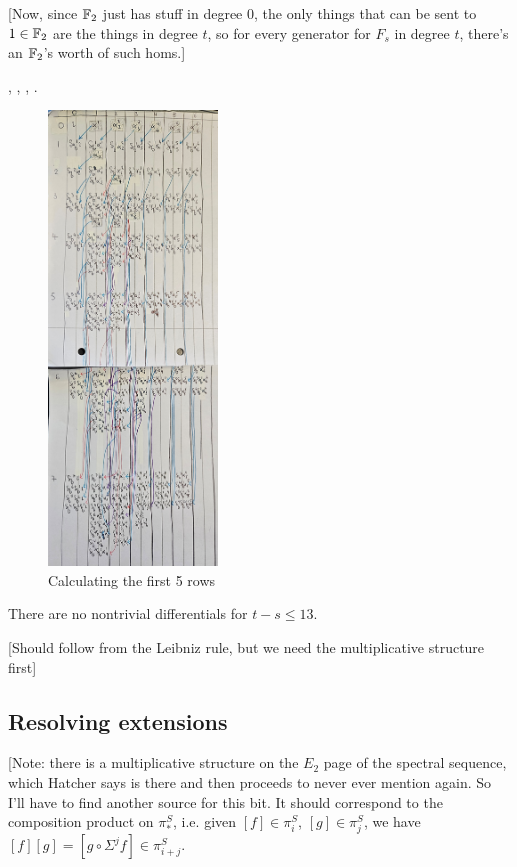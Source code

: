 \documentclass{MetricNotes2023}
\def\bb{\ensuremath\mathbb}
\begin{document}
[Now, since \(\bb{F}_2\) just has stuff in degree 0, the only things that can be sent to \(1 \in \bb{F}_2\) are the things in degree \(t\), so for every generator for \(F_s\) in degree \(t\), there's an \(\bb{F}_2\)'s worth of such homs.]

\autocite{stable_homotopy}, \autocite{cobordism}, \autocite{ass}, \autocite{hatcher5}.

\begin{figure}[H]
\centering
\includegraphics[width=0.4\textwidth]{ext3}
\caption{Calculating the first 5 rows}
\end{figure}

\begin{lemma}[?]
There are no nontrivial differentials for \(t-s\leq 13\). 
\end{lemma}

[Should follow from the Leibniz rule, but we need the multiplicative structure first]

\subsection{Resolving extensions}

[Note: there is a multiplicative structure on the \(E_2\) page of the spectral sequence, which Hatcher says is there and then proceeds to never ever mention again. So I'll have to find another source for this bit. It should correspond to the composition product on \(\pi_*^S\), i.e. given \([f]\in \pi_i^S\), \([g]\in \pi_j^S\), we have \([f][g]=[g \circ \Sigma^j f]\in \pi_{i+j}^S\).
\end{document}

